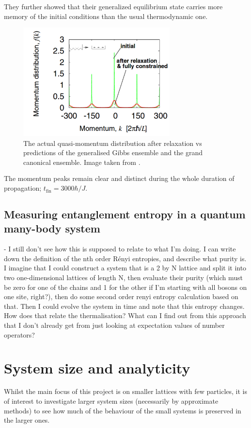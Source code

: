 \documentclass[a4paper,10pt]{article}
\begin{document}
They further showed that their generalized equilibrium state carries more memory of the initial conditions than the usual thermodynamic one.

\begin{figure}[H]
 \begin{center}
 \includegraphics[width=8cm]{after_relaxation_rigol}
 \end{center}
 \caption{The actual quasi-momentum distribution after relaxation vs predictions of the generalised Gibbs ensemble and the grand canonical ensemble. Image taken from \cite{Rigol2007}.}
 \end{figure}

The momentum peaks remain clear and distinct during the whole duration  of  propagation; $t_{\text{fin}}=3000\hbar/J$.

\subsection{Measuring entanglement entropy in a quantum many-body system}
- I still don't see how this is supposed to relate to what I'm doing.
I can write down the definition of the nth order R\'enyi entropies, and describe what purity is. 
I imagine that I could construct a system that is a 2 by N lattice and split it into two one-dimensional lattices of length N, then evaluate their purity (which must be zero for one of the 
chains and 1 for the other if I'm starting with all bosons on one site, right?), then do some second order renyi entropy calculation based on that. Then I could evolve the system in time
and note that this entropy changes. How does that relate the thermalisation? What can I find out from this approach that I don't already get from just looking at expectation values of number 
operators?

\newpage
\section{System size and analyticity}
Whilst the main focus of this project is on smaller lattices with few particles, it is of interest to investigate larger system sizes (necessarily by approximate methods) to see how much
of the behaviour of the small systems is preserved in the larger ones.
\end{document}

